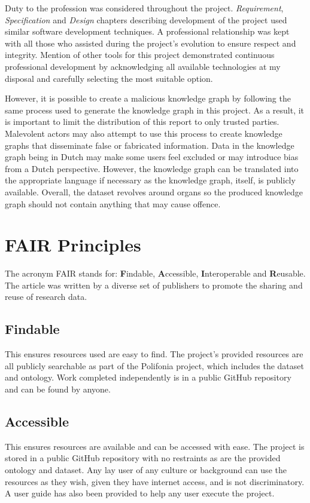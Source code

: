 Duty to the profession was considered throughout the project. \textit{Requirement}, \textit{Specification} and \textit{Design} chapters describing development of the project used similar software development techniques. A professional relationship was kept with all those who assisted during the project's evolution to ensure respect and integrity. Mention of other tools for this project demonstrated continuous professional development by acknowledging all available technologies at my disposal and carefully selecting the most suitable option. 

However, it is possible to create a malicious knowledge graph by following the same process used to generate the knowledge graph in this project. As a result, it is important to limit the distribution of this report to only trusted parties. Malevolent actors may also attempt to use this process to create knowledge graphs that disseminate false or fabricated information. Data in the knowledge graph being in Dutch may make some users feel excluded or may introduce bias from a Dutch perspective. However, the knowledge graph can be translated into the appropriate language if necessary as the knowledge graph, itself, is publicly available. Overall, the dataset revolves around organs so the produced knowledge graph should not contain anything that may cause offence.

\section{FAIR Principles}
\hspace{0.5cm} The acronym FAIR stands for: \textbf{F}indable, \textbf{A}ccessible, \textbf{I}nteroperable and \textbf{R}eusable. The article \cite{fairprinciples} was written by a diverse set of publishers to promote the sharing and reuse of research data. 

\subsection{Findable}
\hspace{0.5cm} This ensures resources used are easy to find. The project's provided resources are all publicly searchable as part of the Polifonia project, which includes the dataset and ontology. Work completed independently is in a public GitHub repository and can be found by anyone. 

\subsection{Accessible}
\hspace{0.5cm} This ensures resources are available and can be accessed with ease. The project is stored in a public GitHub repository with no restraints as are the provided ontology and dataset. Any lay user of any culture or background can use the resources as they wish, given they have internet access, and is not discriminatory. A user guide has also been provided to help any user execute the project. 


